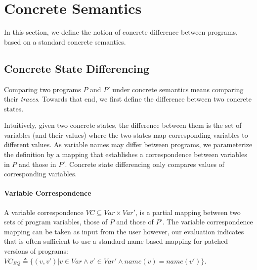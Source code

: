 \section{Concrete Semantics}
In this section, we define the notion of concrete difference between programs, based on a standard concrete semantics.

\subsection{Concrete State Differencing}
Comparing two programs $P$ and $P'$ under concrete semantics means comparing their \emph{traces}. Towards that end, we first define the difference between two concrete states.

Intuitively, given two concrete states, the difference between them is the set of variables (and their values) where the two states map corresponding variables to different values. As variable names may differ between programs, we parameterize the definition by a mapping that establishes a correspondence between variables in $P$ and those in $P'$. Concrete state differencing only compares values of corresponding variables.

\paragraph{Variable Correspondence} 
A variable correspondence $VC \subseteq Var \times Var'$, is a partial mapping between two sets of program variables, those of $P$ and those of $P'$. The variable correspondence mapping can be taken as input from the user however, our evaluation indicates that is often sufficient to use a standard name-based mapping for patched versions of programs:  $VC_{EQ} \triangleq \{(v,v') | v \in Var \wedge v' \in Var' \wedge name(v) = name(v')\}$.






